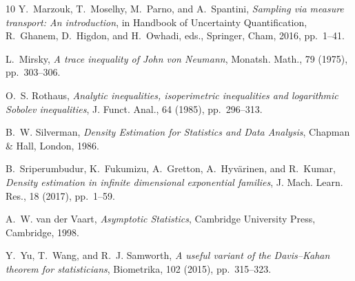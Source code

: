 \begin{thebibliography}{10}
{\sc Y.~Marzouk, T.~Moselhy, M.~Parno, and A.~Spantini}, {\em Sampling via measure transport: An introduction}, in Handbook of Uncertainty Quantification, R.~Ghanem, D.~Higdon, and H.~Owhadi, eds., Springer, Cham, 2016, pp.~1--41.

{\sc L.~Mirsky}, {\em A trace inequality of {J}ohn von {N}eumann}, Monatsh. Math., 79 (1975), pp.~303--306.

{\sc O.~S. Rothaus}, {\em Analytic inequalities, isoperimetric inequalities and logarithmic {S}obolev inequalities}, J. Funct. Anal., 64 (1985), pp.~296--313.

{\sc B.~W. Silverman}, {\em Density Estimation for Statistics and Data Analysis}, Chapman \& Hall, London, 1986.

{\sc B.~Sriperumbudur, K.~Fukumizu, A.~Gretton, A.~Hyv\"arinen, and R.~Kumar}, {\em Density estimation in infinite dimensional exponential families}, J. Mach. Learn. Res., 18 (2017), pp.~1--59.

{\sc A.~W. van der Vaart}, {\em Asymptotic Statistics}, Cambridge University Press, Cambridge, 1998.

{\sc Y.~Yu, T.~Wang, and R.~J. Samworth}, {\em A useful variant of the {D}avis--{K}ahan theorem for statisticians}, Biometrika, 102 (2015), pp.~315--323.

\end{thebibliography}
